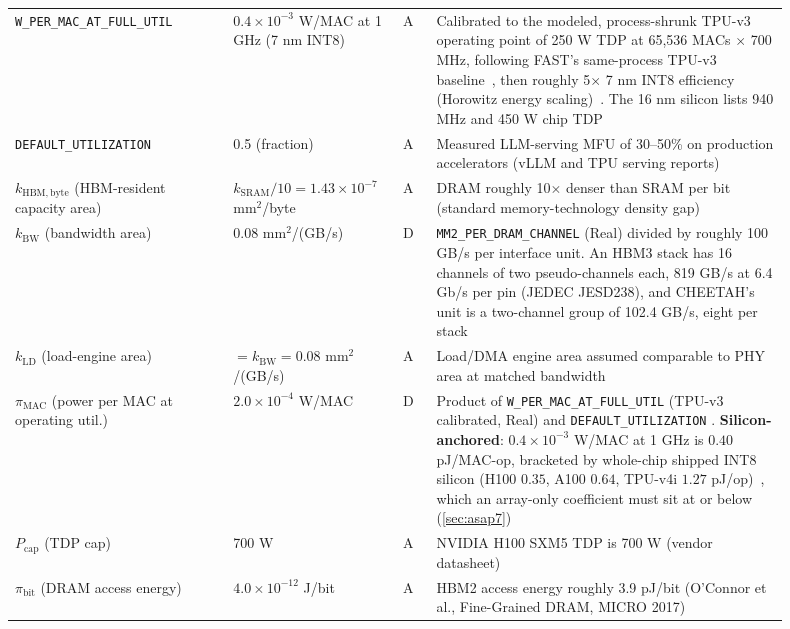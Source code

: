 \begin{table}[!htb]
\begin{tabular}{@{}p{0.26\linewidth}p{0.17\linewidth}p{0.045\linewidth}p{0.42\linewidth}@{}}
\texttt{W\_\allowbreak PER\_\allowbreak MAC\_\allowbreak AT\_\allowbreak FULL\_\allowbreak UTIL} & $0.4\times10^{-3}$ W/MAC at 1 GHz (7 nm INT8) & A & Calibrated to the modeled, process-shrunk TPU-v3 operating point of 250 W TDP at 65{,}536 MACs $\times$ 700 MHz, following FAST's same-process TPU-v3 baseline~\citep{zhang_fast}, then roughly 5$\times$ 7 nm INT8 efficiency (Horowitz energy scaling)~\citep{horowitz2014energy}. The 16 nm silicon lists 940 MHz and 450 W chip TDP~\citep{jouppi2021ten} \\
\texttt{DEFAULT\_\allowbreak UTILIZATION} & 0.5 (fraction) & A & Measured LLM-serving MFU of 30--50\% on production accelerators (vLLM and TPU serving reports) \citep{kwon2023vllm,pope2023efficiently} \\
$k_{\mathrm{HBM,byte}}$ (HBM-resident capacity area) & $k_{\mathrm{SRAM}}/10 = 1.43\times10^{-7}$ $\mathrm{mm}^2$/byte & A & DRAM roughly 10$\times$ denser than SRAM per bit (standard memory-technology density gap)~\citep{hennessy2017caqa} \\
$k_{\mathrm{BW}}$ (bandwidth area) & 0.08 $\mathrm{mm}^2$/(GB/s) & D & \texttt{MM2\_\allowbreak PER\_\allowbreak DRAM\_\allowbreak CHANNEL} (Real) divided by roughly 100 GB/s per interface unit. An HBM3 stack has 16 channels of two pseudo-channels each, 819 GB/s at 6.4 Gb/s per pin (JEDEC JESD238), and CHEETAH's unit is a two-channel group of 102.4 GB/s, eight per stack~\citep{jedec2022hbm3} \\
$k_{\mathrm{LD}}$ (load-engine area) & $= k_{\mathrm{BW}} = 0.08$ $\mathrm{mm}^2$/(GB/s) & A & Load/DMA engine area assumed comparable to PHY area at matched bandwidth \\
$\pi_{\mathrm{MAC}}$ (power per MAC at operating util.) & $2.0\times10^{-4}$ W/MAC & D & Product of \texttt{W\_\allowbreak PER\_\allowbreak MAC\_\allowbreak AT\_\allowbreak FULL\_\allowbreak UTIL} (TPU-v3 calibrated, Real) and \texttt{DEFAULT\_\allowbreak UTILIZATION} \citep{jouppi2021ten}. \textbf{Silicon-anchored}: $0.4\times10^{-3}$ W/MAC at 1 GHz is $0.40$ pJ/MAC-op, bracketed by whole-chip shipped INT8 silicon (H100 $0.35$, A100 $0.64$, TPU-v4i $1.27$ pJ/op)~\citep{nvidia2022hopper,jouppi2021ten}, which an array-only coefficient must sit at or below (\cref{sec:asap7}) \\
$P_{\mathrm{cap}}$ (TDP cap) & 700 W & A & NVIDIA H100 SXM5 TDP is 700 W (vendor datasheet)~\citep{nvidia2022hopper} \\
$\pi_{\mathrm{bit}}$ (DRAM access energy) & $4.0\times10^{-12}$ J/bit & A & HBM2 access energy roughly 3.9 pJ/bit (O'Connor et al., Fine-Grained DRAM, MICRO 2017)~\citep{oconnor2017finegrained} \\
\bottomrule
\end{tabular}

\end{table}
